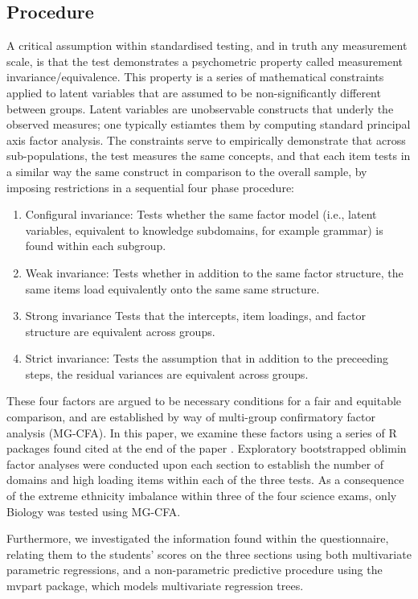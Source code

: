 \documentclass{article}\usepackage[]{graphicx}\usepackage[]{color}
\begin{document}
\subsection{Procedure}
A critical assumption within standardised testing, and in truth any measurement scale, is that the test demonstrates a psychometric property called measurement invariance/equivalence. This property is a series of mathematical constraints applied to latent variables that are assumed to be non-significantly different between groups. Latent variables are unobservable constructs that underly the observed measures; one typically estiamtes them by computing standard principal axis factor analysis. The constraints serve to empirically demonstrate that across sub-populations, the test measures the same concepts, and that each item tests in a similar way the same construct in comparison to the overall sample, by imposing restrictions in a sequential four phase procedure:
\begin{enumerate}
\item{Configural invariance:} 
Tests whether the same factor model (i.e., latent variables, equivalent to knowledge subdomains, for example grammar) is found within each subgroup.
\item{Weak invariance:}
Tests whether in addition to the same factor structure, the same items load equivalently onto the same same structure.
\item{Strong invariance}
Tests that the intercepts, item loadings, and factor structure are equivalent across groups.
\item{Strict invariance:}
Tests the assumption that in addition to the preceeding steps, the residual variances are equivalent across groups.
\end{enumerate}
These four factors are argued to be necessary conditions for a fair and equitable comparison\cite{Meredith}, and are established by way of multi-group confirmatory factor analysis (MG-CFA). In this paper, we examine these factors using a series of R packages found cited at the end of the paper \cite{psych,lavaan,semTools}. 
Exploratory bootstrapped oblimin factor analyses were conducted upon each section to establish the number of domains and high loading items within each of the three tests. As a consequence of the extreme ethnicity imbalance within three of the four science exams, only Biology was tested using MG-CFA.

Furthermore, we investigated the information found within the questionnaire, relating them to the students' scores on the three sections using both multivariate parametric regressions, and a non-parametric predictive procedure using the mvpart package, which models multivariate regression trees.
\end{document}
